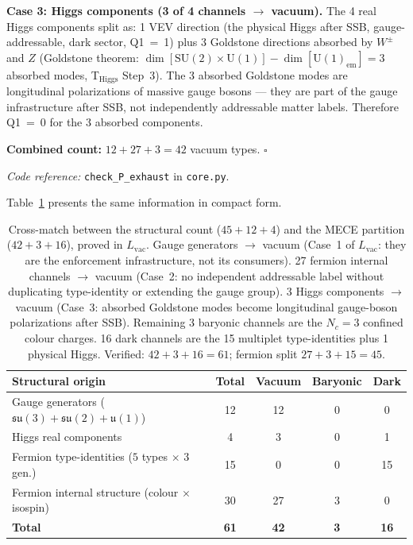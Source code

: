 \documentclass[11pt]{article}
\newcommand{\coderef}[2]{\smallskip\noindent\textit{Code reference:} \texttt{#1} in \texttt{#2}.}
\newcommand{\SU}{\mathrm{SU}}
\newcommand{\U}{\mathrm{U}}
\begin{document}
\begin{tcolorbox}[apfbox, title={Lemma $L_{\mathrm{vac}}$ (Vacuum Sector Assignment)}]
\medskip\noindent\textbf{Case 3: Higgs components (3 of 4 channels $\to$ vacuum).}
The 4 real Higgs components split as: 1 VEV direction (the physical Higgs after SSB, gauge-addressable, dark sector, Q1~=~1) plus 3 Goldstone directions absorbed by $W^\pm$ and $Z$ (Goldstone theorem: $\dim[\SU(2) \times \U(1)] - \dim[\U(1)_{\mathrm{em}}] = 3$ absorbed modes, T$_{\mathrm{Higgs}}$ Step~3).  The 3 absorbed Goldstone modes are longitudinal polarizations of massive gauge bosons --- they are part of the gauge infrastructure after SSB, not independently addressable matter labels.  Therefore Q1~=~0 for the 3 absorbed components.

\medskip\noindent\textbf{Combined count:} $12 + 27 + 3 = 42$ vacuum types.  $\square$

\coderef{check\_P\_exhaust}{core.py}
\end{tcolorbox}

Table~\ref{tab:crossmatch} presents the same information in compact form.

\begin{table}[ht]
\centering\small
\begin{tabular}{lcccc}
\toprule
\textbf{Structural origin} & \textbf{Total} & \textbf{Vacuum} & \textbf{Baryonic} & \textbf{Dark} \\
\midrule
Gauge generators ($\mathfrak{su}(3)\!+\mathfrak{su}(2)\!+\mathfrak{u}(1)$) & 12 & 12 & 0 & 0 \\
Higgs real components & 4 & 3 & 0 & 1 \\
Fermion type-identities ($5$ types $\times$ $3$ gen.) & 15 & 0 & 0 & 15 \\
Fermion internal structure (colour $\times$ isospin) & 30 & 27 & 3 & 0 \\
\midrule
\textbf{Total} & \textbf{61} & \textbf{42} & \textbf{3} & \textbf{16} \\
\bottomrule
\end{tabular}
\caption{Cross-match between the structural count ($45 + 12 + 4$) and the MECE partition ($42 + 3 + 16$), proved in $L_{\mathrm{vac}}$.  Gauge generators $\to$ vacuum (Case~1 of $L_{\mathrm{vac}}$: they are the enforcement infrastructure, not its consumers).  27 fermion internal channels $\to$ vacuum (Case~2: no independent addressable label without duplicating type-identity or extending the gauge group).  3 Higgs components $\to$ vacuum (Case~3: absorbed Goldstone modes become longitudinal gauge-boson polarizations after SSB).  Remaining 3 baryonic channels are the $N_c = 3$ confined colour charges.  16 dark channels are the 15 multiplet type-identities plus 1 physical Higgs.  Verified: $42 + 3 + 16 = 61$; fermion split $27 + 3 + 15 = 45$.}
\label{tab:crossmatch}
\end{table}
\end{document}
